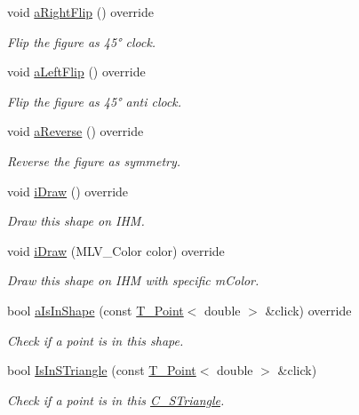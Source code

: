 \begin{DoxyCompactItemize}
void \hyperlink{classC__STriangle_aa3cad7b7367c253000cf0f91f55ba600}{a\+Right\+Flip} () override
\begin{DoxyCompactList}\small\item\em Flip the figure as 45° clock. \end{DoxyCompactList}\item 
void \hyperlink{classC__STriangle_aff480b9ec706ee5ae58f6f78318e2728}{a\+Left\+Flip} () override
\begin{DoxyCompactList}\small\item\em Flip the figure as 45° anti clock. \end{DoxyCompactList}\item 
void \hyperlink{classC__STriangle_a5402899ec4ea0de3ca3e7aa6f184a1c7}{a\+Reverse} () override
\begin{DoxyCompactList}\small\item\em Reverse the figure as symmetry. \end{DoxyCompactList}\item 
void \hyperlink{classC__STriangle_a7297480fe52b58654d81e2e70fbb237d}{i\+Draw} () override
\begin{DoxyCompactList}\small\item\em Draw this shape on I\+HM. \end{DoxyCompactList}\item 
void \hyperlink{classC__STriangle_ad003b932a467de60b814d897fda38390}{i\+Draw} (M\+L\+V\+\_\+\+Color color) override
\begin{DoxyCompactList}\small\item\em Draw this shape on I\+HM with specific m\+Color. \end{DoxyCompactList}\item 
bool \hyperlink{classC__STriangle_a3bc82d7ea53a6a058b9fb49bbd89282c}{a\+Is\+In\+Shape} (const \hyperlink{classT__Point}{T\+\_\+\+Point}$<$ double $>$ \&click) override
\begin{DoxyCompactList}\small\item\em Check if a point is in this shape. \end{DoxyCompactList}\item 
bool \hyperlink{classC__STriangle_ae0cfadc631baf280df7e77f011489caa}{Is\+In\+S\+Triangle} (const \hyperlink{classT__Point}{T\+\_\+\+Point}$<$ double $>$ \&click)
\begin{DoxyCompactList}\small\item\em Check if a point is in this \hyperlink{classC__STriangle}{C\+\_\+\+S\+Triangle}. \end{DoxyCompactList}\item 

\end{DoxyCompactItemize}
